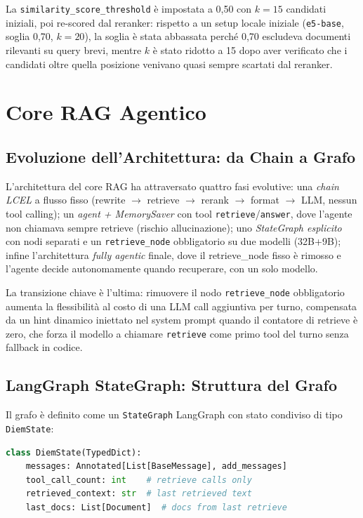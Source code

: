 \documentclass[11pt,a4paper]{article}
\newcommand{\code}[1]{\texttt{\small#1}}
\begin{document}
La \code{similarity\_score\_threshold} è impostata a 0,50 con $k=15$ candidati iniziali,
poi re-scored dal reranker: rispetto a un setup locale iniziale (\texttt{e5-base}, soglia
0,70, $k=20$), la soglia è stata abbassata perché 0,70 escludeva documenti rilevanti su
query brevi, mentre $k$ è stato ridotto a 15 dopo aver verificato che i candidati oltre
quella posizione venivano quasi sempre scartati dal reranker.

\section{Core RAG Agentico}
\label{sec:core-rag}

\subsection{Evoluzione dell'Architettura: da Chain a Grafo}

L'architettura del core RAG ha attraversato quattro fasi evolutive: una \emph{chain LCEL}
a flusso fisso (rewrite $\to$ retrieve $\to$ rerank $\to$ format $\to$ LLM, nessun tool
calling); un \emph{agent + MemorySaver} con tool \code{retrieve}/\code{answer}, dove
l'agente non chiamava sempre retrieve (rischio allucinazione); uno \emph{StateGraph
esplicito} con nodi separati e un \code{retrieve\_node} obbligatorio su due modelli
(32B+9B); infine l'architettura \emph{fully agentic} finale, dove il retrieve\_node fisso
è rimosso e l'agente decide autonomamente quando recuperare, con un solo modello.

La transizione chiave è l'ultima: rimuovere il nodo \code{retrieve\_node} obbligatorio
aumenta la flessibilità al costo di una LLM call aggiuntiva per turno, compensata da un
hint dinamico iniettato nel system prompt quando il contatore di retrieve è zero, che
forza il modello a chiamare \code{retrieve} come primo tool del turno senza fallback in
codice.

\subsection{LangGraph StateGraph: Struttura del Grafo}
\label{sec:graph}

Il grafo è definito come un \code{StateGraph} LangGraph con stato condiviso di tipo
\code{DiemState}:

\begin{lstlisting}[language=Python, caption={Definizione di DiemState (src/agent/state.py)}]
class DiemState(TypedDict):
    messages: Annotated[List[BaseMessage], add_messages]
    tool_call_count: int    # retrieve calls only
    retrieved_context: str  # last retrieved text
    last_docs: List[Document]  # docs from last retrieve
\end{lstlisting}
\end{document}
